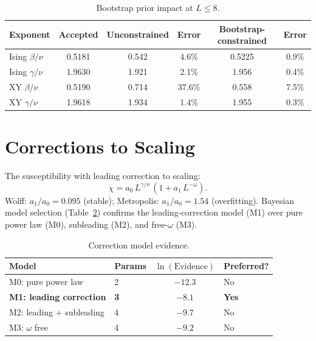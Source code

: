 \documentclass[11pt,a4paper]{article}
\begin{document}
\begin{table}[ht]
\centering
\caption{Bootstrap prior impact at $L \leq 8$.}
\label{tab:bootstrap}
\begin{tabular}{@{}lccccc@{}}
\toprule
Exponent & Accepted & Unconstrained & Error & Bootstrap-constrained & Error \\
\midrule
Ising $\beta/\nu$ & 0.5181 & 0.542 & 4.6\% & 0.5225 & 0.9\% \\
Ising $\gamma/\nu$ & 1.9630 & 1.921 & 2.1\% & 1.956 & 0.4\% \\
XY $\beta/\nu$ & 0.5190 & 0.714 & 37.6\% & 0.558 & 7.5\% \\
XY $\gamma/\nu$ & 1.9618 & 1.934 & 1.4\% & 1.955 & 0.3\% \\
\bottomrule
\end{tabular}
\end{table}

\section{Corrections to Scaling}\label{sec:corrections}

The susceptibility with leading correction to scaling:
\[
  \chi = a_0\, L^{\gamma/\nu}\,(1 + a_1\, L^{-\omega}).
\]
Wolff: $a_1/a_0 = 0.095$ (stable); Metropolis: $a_1/a_0 = 1.54$ (overfitting). Bayesian model selection (Table~\ref{tab:model_evidence}) confirms the leading-correction model (M1) over pure power law (M0), subleading (M2), and free-$\omega$ (M3).

\begin{table}[ht]
\centering
\caption{Correction model evidence.}
\label{tab:model_evidence}
\begin{tabular}{@{}llcl@{}}
\toprule
Model & Params & $\ln(\text{Evidence})$ & Preferred? \\
\midrule
M0: pure power law & 2 & $-12.3$ & No \\
\textbf{M1: leading correction} & \textbf{3} & $\boldsymbol{-8.1}$ & \textbf{Yes} \\
M2: leading + subleading & 4 & $-9.7$ & No \\
M3: $\omega$ free & 4 & $-9.2$ & No \\
\bottomrule
\end{tabular}
\end{table}

\end{document}
